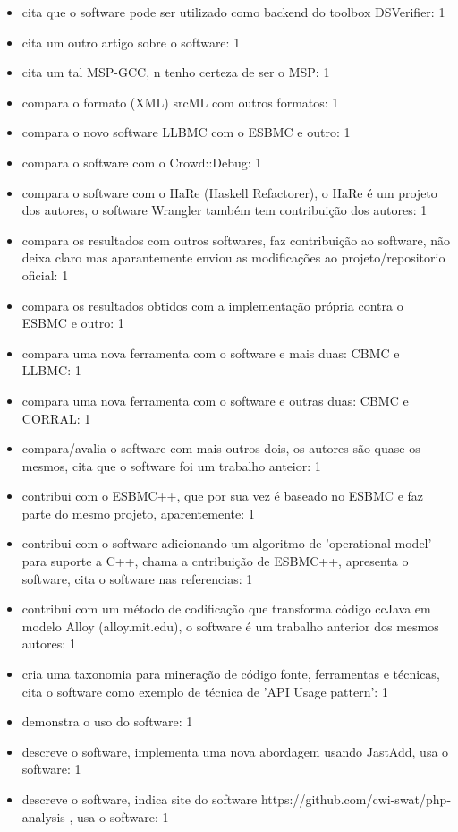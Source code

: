 \begin{itemize}
\item cita que o software pode ser utilizado como backend do toolbox DSVerifier: 1
\item cita um outro artigo sobre o software: 1
\item cita um tal MSP-GCC, n tenho certeza de ser o MSP: 1
\item compara o formato (XML) srcML com outros formatos: 1
\item compara o novo software LLBMC com o ESBMC e outro: 1
\item compara o software com o Crowd::Debug: 1
\item compara o software com o HaRe (Haskell Refactorer), o HaRe é um projeto dos autores, o software Wrangler também tem contribuição dos autores: 1
\item compara os resultados com outros softwares, faz contribuição ao software, não deixa claro mas aparantemente enviou as modificações ao projeto/repositorio oficial: 1
\item compara os resultados obtidos com a implementação própria contra o ESBMC e outro: 1
\item compara uma nova ferramenta com o software e mais duas: CBMC e LLBMC: 1
\item compara uma nova ferramenta com o software e outras duas: CBMC e CORRAL: 1
\item compara/avalia o software com mais outros dois, os autores são quase os mesmos, cita que o software foi um trabalho anteior: 1
\item contribui com o ESBMC++, que por sua vez é baseado no ESBMC e faz parte do mesmo projeto, aparentemente: 1
\item contribui com o software adicionando um algoritmo de 'operational model' para suporte a C++, chama a cntribuição de ESBMC++, apresenta o software, cita o software nas referencias: 1
\item contribui com um método de codificação que transforma código ccJava em modelo Alloy (alloy.mit.edu), o software é um trabalho anterior dos mesmos autores: 1
\item cria uma taxonomia para mineração de código fonte, ferramentas e técnicas, cita o software como exemplo de técnica de 'API Usage pattern': 1
\item demonstra o uso do software: 1
\item descreve o software, implementa uma nova abordagem usando JastAdd, usa o software: 1
\item descreve o software, indica site do software https://github.com/cwi-swat/php-analysis , usa o software: 1

\end{itemize}
